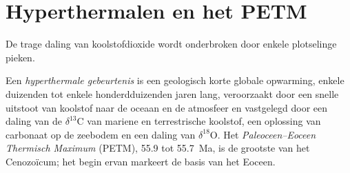 \section{Hyperthermalen en het PETM}\label{sec:b2:deep-time-climate:petm}

De trage daling van koolstofdioxide wordt onderbroken door enkele plotselinge pieken.

\begin{definition}\label{def:b2:deep-time-climate:petm}
Een \emph{hyperthermale gebeurtenis} is een geologisch korte globale opwarming, enkele
duizenden tot enkele honderdduizenden jaren lang, veroorzaakt door een snelle uitstoot van koolstof naar de oceaan en de
atmosfeer en vastgelegd door een daling van de $\delta^{13}$C van mariene en terrestrische koolstof, een
oplossing van carbonaat op de zeebodem en een daling van $\delta^{18}$O. Het \emph{Paleoceen--Eoceen
Thermisch Maximum} (PETM), 55.9 tot \qty{55.7}{Ma}, is de
grootste van het Cenozoïcum; het begin ervan markeert de basis van het Eoceen.
\end{definition}

